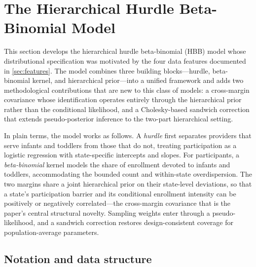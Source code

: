 
\section{The Hierarchical Hurdle Beta-Binomial Model}\label{sec:model}

This section develops the hierarchical hurdle beta-binomial (HBB) model
whose distributional specification was motivated by the four data features
documented in \cref{sec:features}.  The model combines three
building blocks---hurdle, beta-binomial kernel, and hierarchical
prior---into a unified framework and adds two methodological
contributions that are new to this class of models: a cross-margin
covariance whose identification operates entirely through the
hierarchical prior rather than the conditional likelihood, and a
Cholesky-based sandwich correction that extends
pseudo-posterior inference to the two-part hierarchical setting.

In plain terms, the model works as follows.  A \emph{hurdle} first
separates providers that serve infants and toddlers from those that do
not, treating participation as a logistic regression with
state-specific intercepts and slopes.  For participants, a
\emph{beta-binomial} kernel models the share of enrollment devoted to
infants and toddlers, accommodating the bounded count and within-state
overdispersion.  The two margins share a joint hierarchical prior on
their state-level deviations, so that a state's participation barrier
and its conditional enrollment intensity can be positively or negatively
correlated---the cross-margin covariance that is the paper's central
structural novelty.  Sampling weights enter through a
pseudo-likelihood, and a sandwich correction restores design-consistent
coverage for population-average parameters.


\subsection{Notation and data structure}\label{sec:notation}

